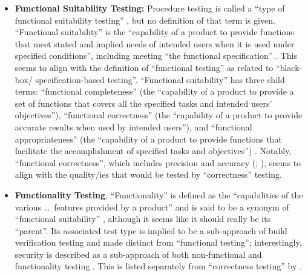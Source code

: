 \begin{itemize}
      \item \textbf{Functional Suitability Testing:} Procedure testing is
            called a ``type of functional suitability testing''
            \citep[p.~7]{IEEE2022}, but no definition of that term is given.
            ``Functional suitability'' is the
            ``capability of a product to provide functions that meet stated and
            implied needs of intended users when it is used under specified
            conditions'', including meeting ``the functional specification''
            \citep{ISO_IEC2023a}. This seems to align with the definition of
            ``functional testing'' as related to ``black-box/%
            specification-based testing''. ``Functional suitability'' has
            three child terms: ``functional completeness'' (the ``capability of
            a product to provide a set of functions that covers all the
            specified tasks and intended users' objectives''), ``functional
            correctness'' (the ``capability of a product to provide accurate
            results when used by intended users''), and ``functional
            appropriateness'' (the ``capability of a product to provide
            functions that facilitate the accomplishment of specified tasks and
            objectives'') \citep{ISO_IEC2023a}. Notably, ``functional
            correctness'', which includes precision and accuracy
            (\citealp{ISO_IEC2023a}; \citealpISTQB{}), seems to align with
            the quality/ies that would be tested by ``correctness'' testing.

      \item \textbf{Functionality Testing}, ``Functionality'' is defined as the
            ``capabilities of the various \dots\ features provided by a product''
            \citep[p.~196]{IEEE2017} and is said to be a synonym of
            ``functional suitability'' \citepISTQB{}, although it seems
            like it should really be its ``parent''. Its associated test type
            is implied to be a sub-approach of build verification testing
            \citepISTQB{} and made distinct from ``functional testing'';
            interestingly, security is described as a sub-approach of both
            non-functional and functionality testing \citep[Tab.~2]{Gerrard2000a}.
            This is listed separately from ``correctness testing'' by
            \citet[p.~53]{Firesmith2015}.
\end{itemize}

\ifnotpaper
